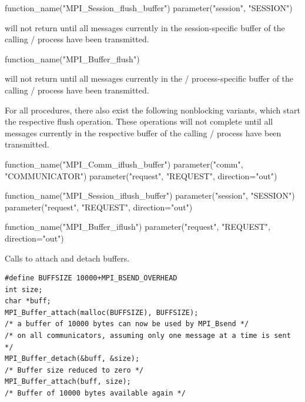 \begin{mpi-binding}
    function_name("MPI_Session_flush_buffer")
    parameter("session", "SESSION")
\end{mpi-binding}

 will not return until all messages currently in the session-specific buffer of the calling \MPI/ process have been transmitted.

\begin{mpi-binding}
    function_name("MPI_Buffer_flush")
\end{mpi-binding}

 will not return until all messages currently in the \MPI/ process-specific buffer of the calling \MPI/ process have been transmitted.


For all  procedures, there also exist the following nonblocking variants, which start the respective flush operation. These operations will not complete until all messages currently in the respective  buffer of the calling \MPI/ process have been transmitted.

\begin{mpi-binding}
    function_name("MPI_Comm_iflush_buffer")
    parameter("comm", "COMMUNICATOR")
    parameter("request", "REQUEST", direction="out")
\end{mpi-binding}

\begin{mpi-binding}
    function_name("MPI_Session_iflush_buffer")
    parameter("session", "SESSION")
    parameter("request", "REQUEST", direction="out")
\end{mpi-binding}

\begin{mpi-binding}
    function_name("MPI_Buffer_iflush")
    parameter("request", "REQUEST", direction="out")
\end{mpi-binding}


\begin{example}
\label{pt2pt-exZ}
%
Calls to attach and detach buffers.
\begin{lstlisting}[language={[MPI]C}]
#define BUFFSIZE 10000+MPI_BSEND_OVERHEAD
int size;
char *buff;
MPI_Buffer_attach(malloc(BUFFSIZE), BUFFSIZE);
/* a buffer of 10000 bytes can now be used by MPI_Bsend */
/* on all communicators, assuming only one message at a time is sent */
MPI_Buffer_detach(&buff, &size);
/* Buffer size reduced to zero */
MPI_Buffer_attach(buff, size);
/* Buffer of 10000 bytes available again */
\end{lstlisting}
\end{example}

